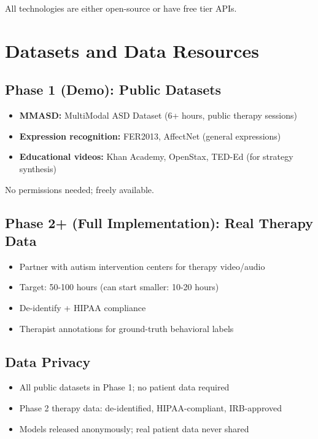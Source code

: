 \documentclass[12pt, a4paper]{article}
\begin{document}
All technologies are either open-source or have free tier APIs.

\section{Datasets and Data Resources}

\subsection{Phase 1 (Demo): Public Datasets}

\begin{itemize}
    \item \textbf{MMASD:} MultiModal ASD Dataset (6+ hours, public therapy sessions)
    \item \textbf{Expression recognition:} FER2013, AffectNet (general expressions)
    \item \textbf{Educational videos:} Khan Academy, OpenStax, TED-Ed (for strategy synthesis)
\end{itemize}

No permissions needed; freely available.

\subsection{Phase 2+ (Full Implementation): Real Therapy Data}

\begin{itemize}
    \item Partner with autism intervention centers for therapy video/audio
    \item Target: 50-100 hours (can start smaller: 10-20 hours)
    \item De-identify + HIPAA compliance
    \item Therapist annotations for ground-truth behavioral labels
\end{itemize}

\subsection{Data Privacy}

\begin{itemize}
    \item All public datasets in Phase 1; no patient data required
    \item Phase 2 therapy data: de-identified, HIPAA-compliant, IRB-approved
    \item Models released anonymously; real patient data never shared
\end{itemize}
\end{document}
